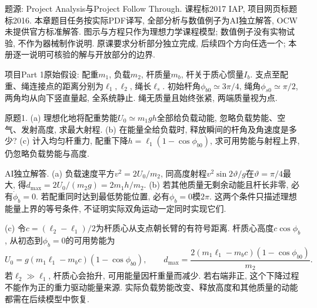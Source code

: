 题源: Project Analysis与Project Follow Through. 课程标2017 IAP, 项目网页标题标2016. 本章题目任务按实际PDF译写, 全部分析与数值例子为AI独立解答, OCW未提供官方标准解答. 图示与方程只作为理想力学课程模型; 数值例子没有实物试验, 不作为器械制作说明. 原课要求分析部分独立完成, 后续四个方向任选一个; 本册逐一说明可核验的解与开放部分的边界.

\begin{exercise}
项目Part 1原始假设: 配重$m_1$, 负载$m_2$, 杆质量$m_b$, 杆关于质心惯量$I_b$. 支点至配重、绳连接点的距离分别为$\ell_1,\ell_2$, 绳长$\ell_s$. 初始杆角$\phi_{b0}\simeq3\pi/4$, 绳角$\phi_{s0}\simeq\pi/2$, 两角均从向下竖直量起, 全系统静止. 绳无质量且始终张紧, 两端质量视为点.

原题1. (a) 理想化地将配重势能$U_0\simeq m_1gh$全部给负载动能, 忽略负载势能、空气、发射高度, 求最大射程. (b) 在能量全给负载时, 释放瞬间的杆角及角速度是多少? (c) 计入均匀杆重力, 配重下降$h=\ell_1(1-\cos\phi_{b0})$, 求可用势能与射程上界, 仍忽略负载势能与高度.
\end{exercise}
\begin{solution}
AI独立解答. (a) 负载速度平方$v^2=2U_0/m_2$, 同高度射程$v^2\sin2\vartheta/g$在$\vartheta=\pi/4$最大, 得$d_{\max}=2U_0/(m_2g)=2m_1h/m_2$. (b) 若其他质量无剩余动能且杆长非零, 必有$\dot\phi_b=0$. 若配重同时达到最低势能位置, 必有$\phi_b=0$模$2\pi$. 这两个条件只描述理想能量上界的等号条件, 不证明实际双角运动一定同时实现它们.

(c) 令$c=(\ell_2-\ell_1)/2$为杆质心从支点朝长臂的有符号距离. 杆质心高度$c\cos\phi_b$, 从初态到$\phi_b=0$的可用势能为
\[
U_0=g(m_1\ell_1-m_bc)(1-\cos\phi_{b0}),\qquad
 d_{\max}=\frac{2(m_1\ell_1-m_bc)(1-\cos\phi_{b0})}{m_2}.
\]
若$\ell_2\gg\ell_1$, 杆质心会抬升, 可用能量因杆重量而减少. 若右端非正, 这个下降过程不能作为正的重力驱动能量来源. 实际负载势能改变、释放高度和其他质量的动能都需在后续模型中恢复.
\end{solution}

